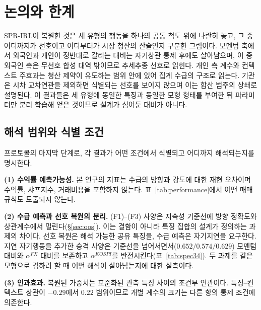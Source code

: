 
\section{논의와 한계}
\label{sec:discussion}

SPR-IRL이 복원한 것은 세 유형의 행동을 하나의 공통 척도 위에 나란히 놓고, 그 중
어디까지가 선호이고 어디부터가 시장 청산의 산술인지 구분한 그림이다. 모멘텀 축에서
외국인과 개인이 정반대로 갈리는 대비는 자기상관 통제 후에도 살아남으며, 이 중
외국인 측은 무선호 합성 대역 밖이므로 추세추종 선호로 읽힌다. 개인 측 계수와 컨텍스트
주효과는 청산 제약이 유도하는 범위 안에 있어 집계 수급의 구조로 읽는다. 기관은 시차
교차연관을 제외하면 식별되는 선호를 보이지 않으며 이는 합산 범주의 상쇄로 설명된다.
이 결과들은 세 유형에 동일한 특징과 동일한 모형 형태를 부여한 뒤 파라미터만 분리
학습해 얻은 것이므로 설계가 심어둔 대비가 아니다.

\subsection{해석 범위와 식별 조건}
\label{sec:scope}

프로토콜의 마지막 단계로, 각 결과가 어떤 조건에서 식별되고 어디까지 해석되는지를
명시한다.

\textbf{(1) 수익률 예측가능성.} 본 연구의 지표는 수급의 방향과 강도에 대한 재현
오차이며 수익률, 샤프지수, 거래비용을 포함하지 않는다. 표~\ref{tab:performance}에서
어떤 매매 규칙도 도출되지 않는다.

\textbf{(2) 수급 예측과 선호 복원의 분리.} (F1)--(F3) 사양은 지속성 기준선에 방향
정확도와 상관계수에서 밀린다(\S\ref{sec:oos}). 이는 결함이 아니라 특징 집합의 설계가
정의하는 과제의 차이다. 선호 복원은 해석 가능한 공유 특징을, 수급 예측은 자기지연을
요구한다. 지연 자기행동을 추가한 승격 사양은 기준선을 넘어서면서($0.652/0.574/
0.629$) 모멘텀 대비와 $\alpha^{FX}$ 대비를 보존하고 $\alpha^{KOSPI}$를
반전시킨다(표~\ref{tab:spec34}). 두 과제를 같은 모형으로 겸하려 할 때 어떤 해석이
살아남는지에 대한 실측이다.

\textbf{(3) 인과효과.} 복원된 가중치는 표준화된 관측 특징 사이의 조건부 연관이다.
특징--컨텍스트 상관이 $-0.29$에서 $0.22$ 범위이므로 개별 계수의 크기는 다른 항의
통제 조건에 의존한다.

